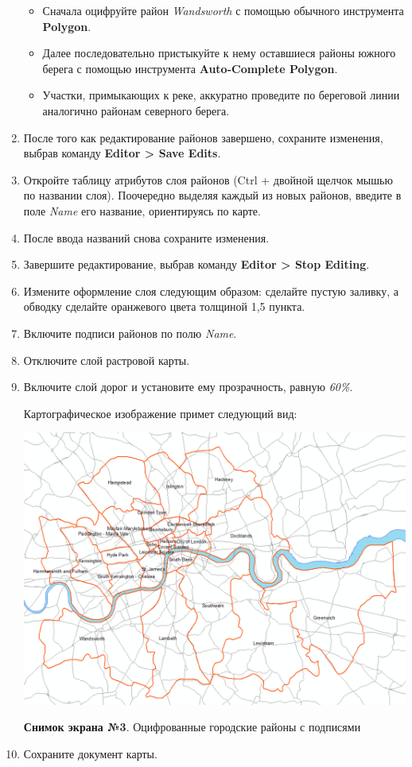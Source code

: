 \documentclass[12pt,]{book}
\begin{document}
\begin{enumerate}
  \begin{itemize}
  \item
    Сначала оцифруйте район \emph{Wandsworth} с помощью обычного инструмента \textbf{Polygon}.
  \item
    Далее последовательно пристыкуйте к нему оставшиеся районы южного берега с помощью инструмента \textbf{Auto-Complete Polygon}.
  \item
    Участки, примыкающих к реке, аккуратно проведите по береговой линии аналогично районам северного берега.
  \end{itemize}
\item
  После того как редактирование районов завершено, сохраните изменения, выбрав команду \textbf{Editor \textgreater{} Save Edits}.
\item
  Откройте таблицу атрибутов слоя районов (Ctrl + двойной щелчок мышью по названии слоя). Поочередно выделяя каждый из новых районов, введите в поле \emph{Name} его название, ориентируясь по карте.
\item
  После ввода названий снова сохраните изменения.
\item
  Завершите редактирование, выбрав команду \textbf{Editor \textgreater{} Stop Editing}.
\item
  Измените оформление слоя следующим образом: сделайте пустую заливку, а обводку сделайте оранжевого цвета толщиной 1,5 пункта.
\item
  Включите подписи районов по полю \emph{Name}.
\item
  Отключите слой растровой карты.
\item
  Включите слой дорог и установите ему прозрачность, равную \emph{60\%}.

  Картографическое изображение примет следующий вид:

  \includegraphics{images/Ex07/image13.png}

  \textbf{Снимок экрана №3}. Оцифрованные городские районы с подписями
\item
  Сохраните документ карты.
\end{enumerate}
\end{document}
